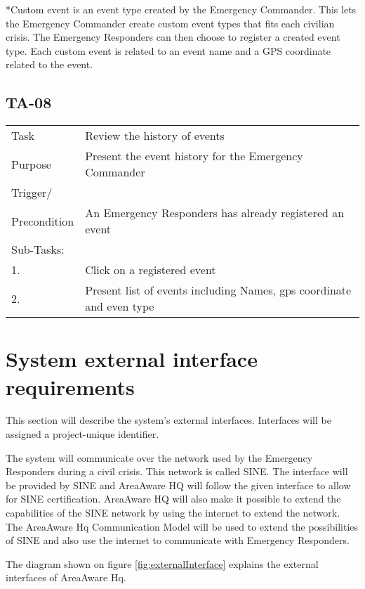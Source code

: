 *Custom event is an event type created by the Emergency Commander. This lets the Emergency Commander create custom event types that fits each civilian crisis. The Emergency Responders can then choose to register a created event type. Each custom event is related to an event name and a GPS coordinate related to the event.

\subsection{TA-08}

\begin{longtable}{| p{2.5cm}  | p{10cm} |  }
	\hline
	Task & Review the history of events \\
	Purpose & Present the event history for the Emergency Commander \\
	Trigger/ &  \\ Precondition & An Emergency Responders has already registered an event \\
	\hline
	Sub-Tasks: & \\
	1. & Click on a registered event \\
	2. & Present list of events including Names, gps coordinate and even type  \\
	\hline
\end{longtable}

\FloatBarrier
\newpage

\label{sec_nonFunc1}
\section{System external interface requirements}
This section will describe the system’s external interfaces. Interfaces will be assigned a project-unique identifier. 

The system will communicate over the network used by the Emergency Responders during a civil crisis. This network is called SINE. The interface will be provided by SINE and AreaAware HQ will follow the given interface to allow for SINE certification. AreaAware HQ will also make it possible to extend the capabilities of the SINE network by using the internet to extend the network. The AreaAware Hq Communication Model will be used to extend the possibilities of SINE and also use the internet to communicate with Emergency Responders.

The diagram shown on figure \ref{fig:externalInterface} explains the external interfaces of AreaAware Hq.


